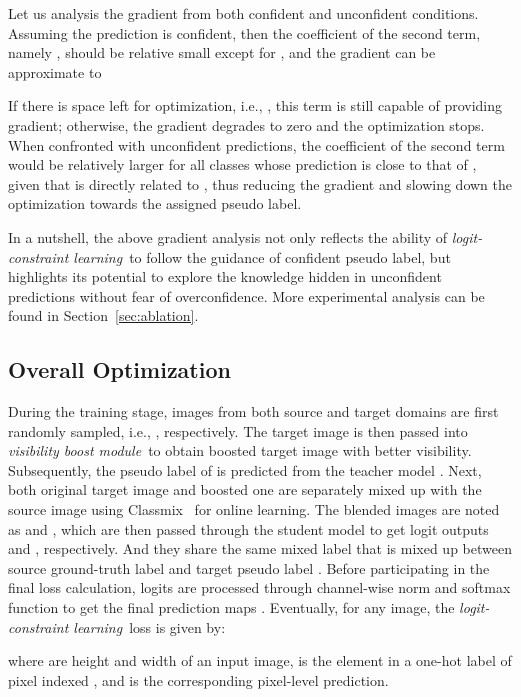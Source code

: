 \documentclass[letterpaper]{article} \usepackage{aaai23}  \usepackage{times}  \usepackage{helvet}  \usepackage{courier}  \usepackage[hyphens]{url}  \usepackage{graphicx} \urlstyle{rm} \def\UrlFont{\rm}  \usepackage{natbib}  \usepackage{caption} \frenchspacing  \setlength{\pdfpagewidth}{8.5in}  \setlength{\pdfpageheight}{11in}  \usepackage{algorithm}
\newcommand{\boostModuleName}{\textit{visibility boost module}}
\newcommand{\lossModuleName}{\textit{logit-constraint learning}}
\begin{document}
Let us analysis the gradient from both confident and unconfident conditions. Assuming the prediction is confident, then the coefficient of the second term, namely , should be relative small except for , and the gradient can be approximate to
\begin{small}
    
\end{small}If there is space left for optimization, i.e., , this term is still capable of providing gradient; otherwise, the gradient degrades to zero and the optimization stops. When confronted with unconfident predictions, the coefficient of the second term would be relatively larger for all classes whose prediction  is close to that of , given that  is directly related to , thus reducing the gradient and slowing down the optimization towards the assigned pseudo label. 

In a nutshell, the above gradient analysis not only reflects the ability of \lossModuleName~to follow the guidance of confident pseudo label, but highlights its potential to explore the knowledge hidden in unconfident predictions without fear of overconfidence. More experimental analysis can be found in Section~\ref{sec:ablation}.

\subsection{Overall Optimization}
During the training stage, images from both source and target domains are first randomly sampled, i.e., , respectively. The target image is then passed into \boostModuleName~to obtain boosted target image  with better visibility. Subsequently, the pseudo label  of  is predicted from the teacher model . Next,  both original target image and boosted one are separately mixed up with the source image using Classmix~\cite{olsson2021classmix} for online learning. The blended images are noted as  and , which are then passed through the student model  to get logit outputs  and , respectively. And they share the same mixed label  that is mixed up between source ground-truth label  and target pseudo label . Before participating in the final loss calculation, logits are processed through channel-wise norm and softmax function to get the final prediction maps . Eventually, for any image, the \lossModuleName~loss is given by:
\begin{small}
    
\end{small}where  are height and width of an input image,  is the  element in a one-hot label of pixel indexed , and  is the corresponding pixel-level prediction.
\end{document}
